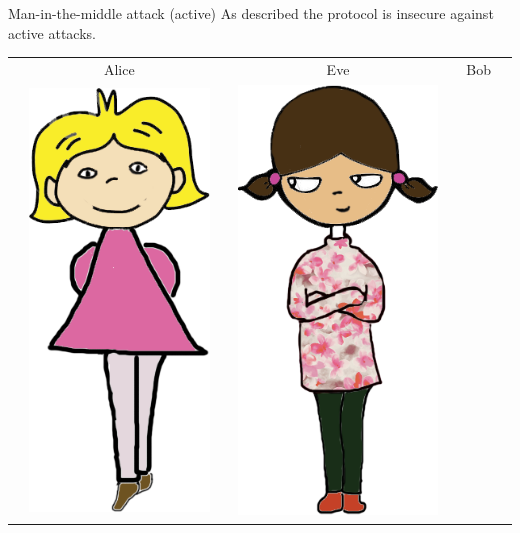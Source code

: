 \documentclass[usenames,dvipsnames, 9pt]{beamer}
\begin{document}
\begin{frame}{Man-in-the-middle attack (active)}
\Large
As described the protocol is insecure against {\color{Orange} active} attacks.
\large
\begin{center}
	\begin{tabular}{l c c c c c l}
		& Alice  & & Eve & & Bob &  \\
		& \multirow{5}{*}{\includegraphics[scale=0.10]{Alice}} & & 
		\multirow{5}{*}{\includegraphics[scale=0.10]{Eve}} & &

\end{tabular}
\end{center}
\end{frame}
\end{document}
